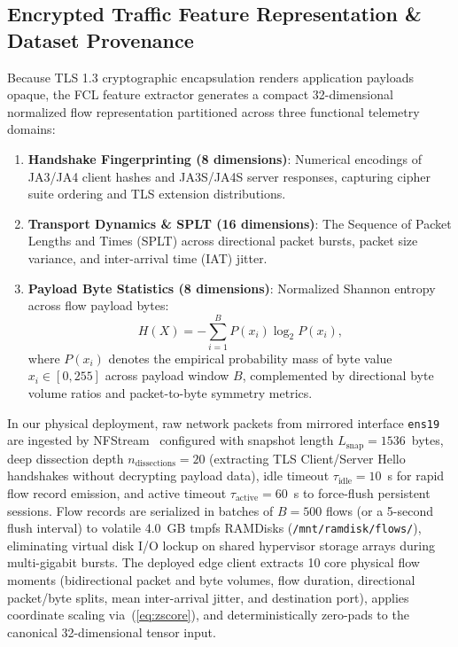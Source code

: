 \documentclass[journal,10pt,twocolumn]{IEEEtran}
\begin{document}
\subsection{Encrypted Traffic Feature Representation \& Dataset Provenance}
\label{sec:dataset_representation}
Because TLS 1.3 cryptographic encapsulation renders application payloads opaque, the FCL feature extractor generates a compact 32-dimensional normalized flow representation partitioned across three functional telemetry domains:
\begin{enumerate}
    \item \textbf{Handshake Fingerprinting (8 dimensions)}: Numerical encodings of JA3/JA4 client hashes and JA3S/JA4S server responses, capturing cipher suite ordering and TLS extension distributions.
    \item \textbf{Transport Dynamics \& SPLT (16 dimensions)}: The Sequence of Packet Lengths and Times (SPLT) across directional packet bursts, packet size variance, and inter-arrival time (IAT) jitter.
    \item \textbf{Payload Byte Statistics (8 dimensions)}: Normalized Shannon entropy across flow payload bytes:
    \begin{equation}
    H(X) = -\sum_{i=1}^{B} P(x_i) \log_2 P(x_i),
    \label{eq:entropy}
    \end{equation}
    where $P(x_i)$ denotes the empirical probability mass of byte value $x_i \in [0, 255]$ across payload window $B$, complemented by directional byte volume ratios and packet-to-byte symmetry metrics.
\end{enumerate}

In our physical deployment, raw network packets from mirrored interface \texttt{ens19} are ingested by NFStream~\cite{aouiti2022nfstream} configured with snapshot length $L_{\text{snap}} = 1536$~bytes, deep dissection depth $n_{\text{dissections}} = 20$ (extracting TLS Client/Server Hello handshakes without decrypting payload data), idle timeout $\tau_{\text{idle}} = 10$~s for rapid flow record emission, and active timeout $\tau_{\text{active}} = 60$~s to force-flush persistent sessions. Flow records are serialized in batches of $B=500$ flows (or a 5-second flush interval) to volatile 4.0~GB tmpfs RAMDisks (\texttt{/mnt/ramdisk/flows/}), eliminating virtual disk I/O lockup on shared hypervisor storage arrays during multi-gigabit bursts. The deployed edge client extracts 10 core physical flow moments (bidirectional packet and byte volumes, flow duration, directional packet/byte splits, mean inter-arrival jitter, and destination port), applies coordinate scaling via~(\ref{eq:zscore}), and deterministically zero-pads to the canonical 32-dimensional tensor input.
\end{document}
